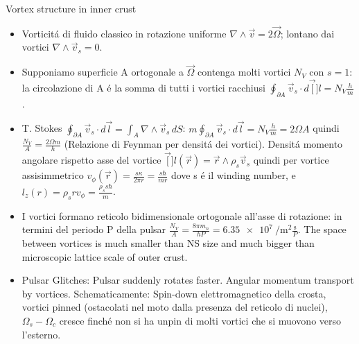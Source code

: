 \begin{frame}{Vortex structure in inner crust}
    \begin{itemize}
        \item Vorticit\'a di fluido classico in rotazione uniforme $\nabla\wedge\vec{v}=2\vec{\Omega}$; lontano dai vortici $\nabla\wedge\vec{v}_s=0$.
        \item Supponiamo superficie A ortogonale a $\vec{\Omega}$ contenga molti vortici $N_V$ con $s=1$: la circolazione di A \'e la somma di tutti i vortici racchiusi $\oint_{\partial A}\vec{v}_s\cdot d\vec[\mathbf]l=N_V \frac{h}{m}$.
        \item T. Stokes $\oint_{\partial A}\vec{v}_s\cdot d\vec{l}=\int_A\nabla\wedge\vec{v}_s\,dS$: $m\oint_{\partial A}\vec{v}_s\cdot d\vec{l}=N_V \frac{h}{m}=2\Omega A$ quindi $\frac{N_V}{A}=\frac{2\Omega m}{h}$ (Relazione di Feynman per densit\'a dei vortici). Densit\'a momento angolare rispetto asse del vortice $\vec[\mathbf]{l}(\vec{r})=\vec{r}\wedge\rho_s\vec{v}_s$ quindi per vortice assisimmetrico $v_{\phi}(\vec{r})=\frac{s\kappa}{2\pi r}=\frac{s\hbar}{mr}$ dove s \'e il winding number, e $l_z(r)=\rho_srv_{\phi}=\frac{\rho_ss\hbar}{m}$.
        \item I vortici formano reticolo bidimensionale ortogonale all'asse di rotazione: in termini del periodo P della pulsar $\frac{N_V}{A}=\frac{8\pi m_n}{hP}=\SI{6.35e7}{\per\square\meter}\frac{\si{\second}}{P}$. The space between vortices is much smaller than NS size and much bigger than microscopic lattice scale of outer crust.
        \item Pulsar Glitches: Pulsar suddenly rotates faster. Angular momentum transport by vortices. Schematicamente: Spin-down elettromagnetico della crosta, vortici pinned (ostacolati nel moto dalla presenza del reticolo di nuclei), $\Omega_s-\Omega_c$ cresce finch\'e non si ha unpin di molti vortici che si muovono verso l'esterno.
    \end{itemize}
\end{frame}

